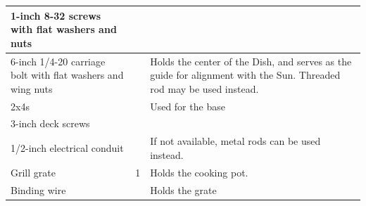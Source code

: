 \documentclass[titlepage]{article}
\begin{document}
\begin{table}[h]
\begin{tabular}{|p{3cm}|p{3cm}|p{11cm}|}
                1-inch 8-32 screws with flat washers and nuts               &                       &                                                                                                                      \\ \hline
                6-inch 1/4-20 carriage bolt with flat washers and wing nuts &                       & Holds the center of the Dish, and serves as the guide for alignment with the Sun.  Threaded rod may be used instead. \\ \hline
                2x4s                                                        &                       & Used for the base                                                                                                    \\ \hline
                3-inch deck screws                                          &                       &                                                                                                                      \\ \hline
                1/2-inch electrical conduit                                 &                       & If not available, metal rods can be used instead.                                                                    \\ \hline
                Grill grate                                                 & 1                     & Holds the cooking pot.                                                                                               \\ \hline
                Binding wire                                                &                       & Holds the grate                                                                                                      \\ \hline
                \end{tabular}
            \end{table}
        \newpage
\end{document}
